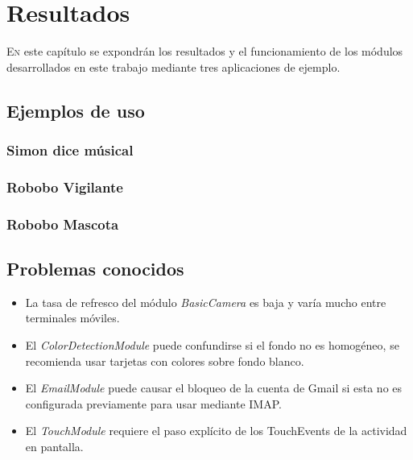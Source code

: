 \chapter{Resultados}
\label{chap:results}
\vspace{0.5cm}


 
\lettrine{E}{n} este capítulo se expondrán los resultados y el funcionamiento de los módulos desarrollados en este trabajo mediante tres aplicaciones de ejemplo.
\section{Ejemplos de uso}
\subsection{Simon dice músical}
\subsection{Robobo Vigilante}
\subsection{Robobo Mascota}


\section{Problemas conocidos}
\begin{itemize}
	\item La tasa de refresco del módulo \textit{BasicCamera} es baja y varía mucho entre terminales móviles.
	\item El \textit{ColorDetectionModule} puede confundirse si el fondo no es homogéneo, se recomienda usar tarjetas con colores sobre fondo blanco.
	\item El \textit{EmailModule} puede causar el bloqueo de la cuenta de Gmail si esta no es configurada previamente para usar mediante IMAP.
	\item El \textit{TouchModule} requiere el paso explícito de los TouchEvents de la actividad en pantalla.
\end{itemize}
\label{sec:known_issues}
    

